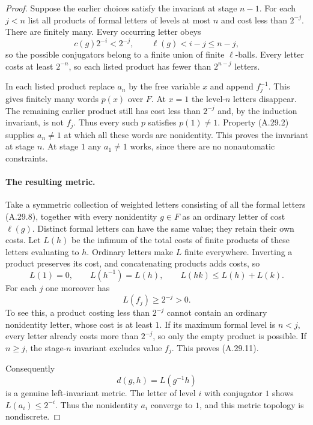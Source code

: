 \begin{proof}
Suppose the earlier choices satisfy the invariant
at stage $n-1$. For each $j<n$ list all products
of formal letters of levels at most $n$ and cost
less than $2^{-j}$. There are finitely many.
Every occurring letter obeys
\[
 c(g)2^{-i}<2^{-j},\qquad
 \ell(g)<i-j\leq n-j,
 \tag{A.29.9}
\]
so the possible conjugators belong to a finite
union of finite $\ell$-balls. Every letter
costs at least $2^{-n}$, so each listed product
has fewer than $2^{n-j}$ letters.

In each listed product replace $a_n$ by the
free variable $x$ and append $f_j^{-1}$.
This gives finitely many words $p(x)$ over $F$.
At $x=1$ the level-$n$ letters disappear.
The remaining earlier product still has cost
less than $2^{-j}$ and, by the induction
invariant, is not $f_j$. Thus every such
$p$ satisfies $p(1)\ne1$. Property (A.29.2)
supplies $a_n\ne1$ at which all these words
are nonidentity. This proves the invariant
at stage $n$. At stage $1$ any $a_1\ne1$
works, since there are no nonautomatic constraints.

\paragraph{The resulting metric.}
Take a symmetric collection of weighted
letters consisting of all the formal letters
(A.29.8), together with every nonidentity
$g\in F$ as an ordinary letter of cost
$\ell(g)$. Distinct formal letters can have
the same value; they retain their own costs.
Let $L(h)$ be the infimum of the total costs
of finite products of these letters evaluating
to $h$. Ordinary letters make $L$ finite
everywhere. Inverting a product preserves its
cost, and concatenating products adds costs,
so
\[
 L(1)=0,\qquad L(h^{-1})=L(h),\qquad
 L(hk)\leq L(h)+L(k).
 \tag{A.29.10}
\]
For each $j$ one moreover has
\[
 L(f_j)\geq2^{-j}>0.
 \tag{A.29.11}
\]
To see this, a product costing less than
$2^{-j}$ cannot contain an ordinary nonidentity
letter, whose cost is at least $1$. If its
maximum formal level is $n<j$, every letter
already costs more than $2^{-j}$, so only the
empty product is possible. If $n\geq j$, the
stage-$n$ invariant excludes value $f_j$.
This proves (A.29.11).

Consequently
\[
 d(g,h)=L(g^{-1}h)
 \tag{A.29.12}
\]
is a genuine left-invariant metric. The letter
of level $i$ with conjugator $1$ shows
$L(a_i)\leq2^{-i}$. Thus the nonidentity
$a_i$ converge to $1$, and this metric
topology is nondiscrete.


\end{proof}
